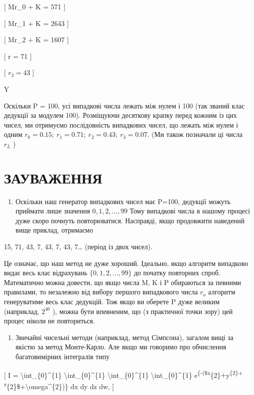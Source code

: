 \documentclass[
]{article}
\providecommand{\tightlist}{%
  \setlength{\itemsep}{0pt}\setlength{\parskip}{0pt}}
\begin{document}
{{{{[} Mr\_0 + K = 571 {]}

{[} Mr\_1 + K = 2643 {]}

{[} Mr\_2 + K = 1607 {]}

{[} r = 71 {]}

{[} \(r_2 = 43\) {]}

Y

Оскільки P = 100, усі випадкові числа лежать між нулем і 100 (так званий
клас дедукції за модулем 100). Розміщуючи десяткову крапку перед кожним
із цих чисел, ми отримуємо послідовність випадкових чисел, що лежать між
нулем і одним \(r_0=0.15;\ r_1=0.71;\ r_2=0.43;\ r_3=0.07.\) (Ми також
позначали ці числа \(r_L\) )

\section{ЗАУВАЖЕННЯ}\label{ux437ux430ux443ux432ux430ux436ux435ux43dux43dux44f-6}

\begin{enumerate}
\def\labelenumi{\arabic{enumi}.}
\tightlist
\item
  Оскільки наш генератор випадкових чисел має P=100, дедукції можуть
  приймати лише значення \(0,1,2,\ldots,99\) Тому випадкові числа в
  нашому процесі дуже скоро почнуть повторюватися. Насправді, якщо
  продовжити наведений вище приклад, отримаємо
\end{enumerate}

15, 71, 43, 7, 43, 7, 43, 7\ldots{} (період із двох чисел).

Це означає, що наш метод не дуже хороший. Ідеально, якщо алгоритм
випадково видає весь клас відрахувань \(\{0, 1, 2, \ldots, 99\}\) до
початку повторних спроб. Математично можна довести, що якщо числа M, K і
P обираються за певними правилами, то незалежно від вибору першого
випадкового числа \(r_o\) алгоритм генеруватиме весь клас дедукцій. Тож
якщо ви оберете P дуже великим (наприклад, \(2^{40}\) ), можна бути
впевненим, що (з практичної точки зору) цей процес ніколи не
повториться.

\begin{enumerate}
\def\labelenumi{\arabic{enumi}.}
\setcounter{enumi}{1}
\tightlist
\item
  Звичайні чисельні методи (наприклад, метод Сімпсона), загалом вищі за
  якістю за метод Монте-Карло. Але якщо ми говоримо про обчислення
  багатовимірних інтегралів типу
\end{enumerate}

{[} I = \textbackslash int\_\{0\}\^{}\{1\}
\textbackslash int\_\{0\}\^{}\{1\} \textbackslash int\_\{0\}\^{}\{1\}
\textbackslash int\_\{0\}\^{}\{1\}
e\textsuperscript{\{-(\$x}\{2\}\(+\)y\textsuperscript{\{2\}\(+\)z}\{2\}\$+\textbackslash omega\^{}\{2\})\}
dx dy dz dw, {]}

}}}
\end{document}
